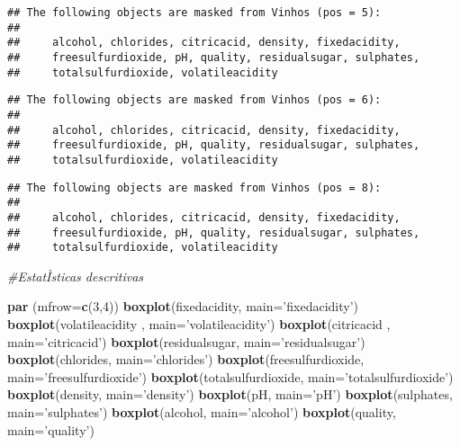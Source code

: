 \documentclass[]{article}
\newenvironment{Shaded}{\begin{snugshade}}{\end{snugshade}}
\newcommand{\KeywordTok}[1]{\textcolor[rgb]{0.13,0.29,0.53}{\textbf{#1}}}
\newcommand{\DataTypeTok}[1]{\textcolor[rgb]{0.13,0.29,0.53}{#1}}
\newcommand{\DecValTok}[1]{\textcolor[rgb]{0.00,0.00,0.81}{#1}}
\newcommand{\StringTok}[1]{\textcolor[rgb]{0.31,0.60,0.02}{#1}}
\newcommand{\CommentTok}[1]{\textcolor[rgb]{0.56,0.35,0.01}{\textit{#1}}}
\newcommand{\NormalTok}[1]{#1}
\begin{document}
\begin{verbatim}
## The following objects are masked from Vinhos (pos = 5):
## 
##     alcohol, chlorides, citricacid, density, fixedacidity,
##     freesulfurdioxide, pH, quality, residualsugar, sulphates,
##     totalsulfurdioxide, volatileacidity
\end{verbatim}

\begin{verbatim}
## The following objects are masked from Vinhos (pos = 6):
## 
##     alcohol, chlorides, citricacid, density, fixedacidity,
##     freesulfurdioxide, pH, quality, residualsugar, sulphates,
##     totalsulfurdioxide, volatileacidity
\end{verbatim}

\begin{verbatim}
## The following objects are masked from Vinhos (pos = 8):
## 
##     alcohol, chlorides, citricacid, density, fixedacidity,
##     freesulfurdioxide, pH, quality, residualsugar, sulphates,
##     totalsulfurdioxide, volatileacidity
\end{verbatim}

\begin{Shaded}
\begin{Highlighting}[]
\CommentTok{#EstatÌsticas descritivas}

\KeywordTok{par}\NormalTok{ (}\DataTypeTok{mfrow=}\KeywordTok{c}\NormalTok{(}\DecValTok{3}\NormalTok{,}\DecValTok{4}\NormalTok{))}
\KeywordTok{boxplot}\NormalTok{(fixedacidity, }\DataTypeTok{main=}\StringTok{'fixedacidity'}\NormalTok{)}
\KeywordTok{boxplot}\NormalTok{(volatileacidity , }\DataTypeTok{main=}\StringTok{'volatileacidity'}\NormalTok{)}
\KeywordTok{boxplot}\NormalTok{(citricacid , }\DataTypeTok{main=}\StringTok{'citricacid'}\NormalTok{)}
\KeywordTok{boxplot}\NormalTok{(residualsugar, }\DataTypeTok{main=}\StringTok{'residualsugar'}\NormalTok{)}
\KeywordTok{boxplot}\NormalTok{(chlorides, }\DataTypeTok{main=}\StringTok{'chlorides'}\NormalTok{)}
\KeywordTok{boxplot}\NormalTok{(freesulfurdioxide, }\DataTypeTok{main=}\StringTok{'freesulfurdioxide'}\NormalTok{)}
\KeywordTok{boxplot}\NormalTok{(totalsulfurdioxide, }\DataTypeTok{main=}\StringTok{'totalsulfurdioxide'}\NormalTok{)}
\KeywordTok{boxplot}\NormalTok{(density, }\DataTypeTok{main=}\StringTok{'density'}\NormalTok{)}
\KeywordTok{boxplot}\NormalTok{(pH, }\DataTypeTok{main=}\StringTok{'pH'}\NormalTok{)}
\KeywordTok{boxplot}\NormalTok{(sulphates, }\DataTypeTok{main=}\StringTok{'sulphates'}\NormalTok{)}
\KeywordTok{boxplot}\NormalTok{(alcohol, }\DataTypeTok{main=}\StringTok{'alcohol'}\NormalTok{)}
\KeywordTok{boxplot}\NormalTok{(quality, }\DataTypeTok{main=}\StringTok{'quality'}\NormalTok{)}
\end{Highlighting}
\end{Shaded}
\end{document}
